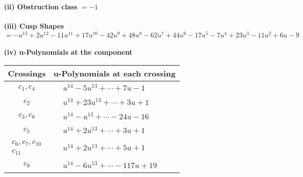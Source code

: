\documentclass[1p]{elsarticle_modified}
\theoremstyle{definition}
\begin{document}
\flushleft \textbf{(ii) Obstruction class $= -1$}\\~\\
\flushleft \textbf{(iii) Cusp Shapes $= - u^{13}+2 u^{12}-11 u^{11}+17 u^{10}-42 u^9+48 u^8-62 u^7+44 u^6-17 u^5-7 u^4+23 u^3-11 u^2+6 u-9$}\\~\\
\newpage\renewcommand{\arraystretch}{1}
\flushleft \textbf{(iv) u-Polynomials at the component}\newline \\
\begin{tabular}{m{50pt}|m{274pt}}
Crossings & \hspace{64pt}u-Polynomials at each crossing \\
\hline $$\begin{aligned}c_{1},c_{4}\end{aligned}$$&$\begin{aligned}
&u^{14}-5 u^{13}+\cdots+7 u-1
\end{aligned}$\\
\hline $$\begin{aligned}c_{2}\end{aligned}$$&$\begin{aligned}
&u^{14}+23 u^{13}+\cdots+3 u+1
\end{aligned}$\\
\hline $$\begin{aligned}c_{3},c_{8}\end{aligned}$$&$\begin{aligned}
&u^{14}- u^{13}+\cdots-24 u-16
\end{aligned}$\\
\hline $$\begin{aligned}c_{5}\end{aligned}$$&$\begin{aligned}
&u^{14}+2 u^{13}+\cdots+3 u+1
\end{aligned}$\\
\hline $$\begin{aligned}c_{6},c_{7},c_{10}\\c_{11}\end{aligned}$$&$\begin{aligned}
&u^{14}+2 u^{13}+\cdots+5 u+1
\end{aligned}$\\
\hline $$\begin{aligned}c_{9}\end{aligned}$$&$\begin{aligned}
&u^{14}-6 u^{13}+\cdots-117 u+19
\end{aligned}$\\
\hline
\end{tabular}\\~\\
\end{document}
